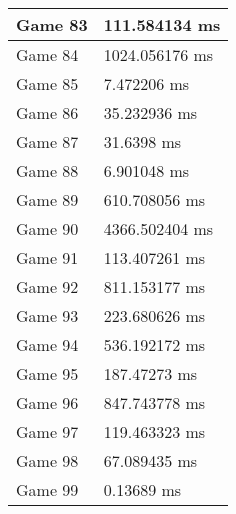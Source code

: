 \begin{tabular}{|l|l|}
	Game 83 & 111.584134 ms \\ \hline
	Game 84 & 1024.056176 ms \\ \hline
	Game 85 & 7.472206 ms \\ \hline
	Game 86 & 35.232936 ms \\ \hline
	Game 87 & 31.6398 ms \\ \hline
	Game 88 & 6.901048 ms \\ \hline
	Game 89 & 610.708056 ms \\ \hline
	Game 90 & 4366.502404 ms \\ \hline
	Game 91 & 113.407261 ms \\ \hline
	Game 92 & 811.153177 ms \\ \hline
	Game 93 & 223.680626 ms \\ \hline
	Game 94 & 536.192172 ms \\ \hline
	Game 95 & 187.47273 ms \\ \hline
	Game 96 & 847.743778 ms \\ \hline
	Game 97 & 119.463323 ms \\ \hline
	Game 98 & 67.089435 ms \\ \hline
	Game 99 & 0.13689 ms \\ \hline
\end{tabular}
